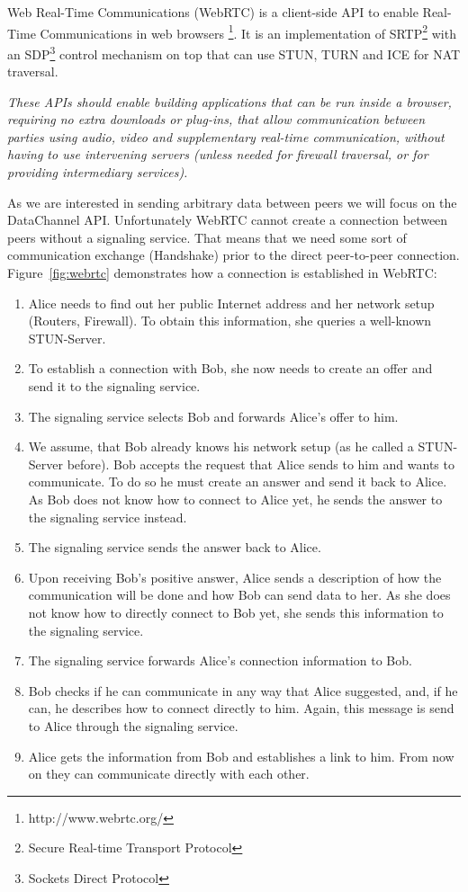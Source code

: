 \documentclass[11pt, english, screen]{report-rd-info}
\begin{document}
Web Real-Time Communications (WebRTC) is a client-side API to enable Real-Time Communications in web browsers \footnote{http://www.webrtc.org/}.
It is an implementation of SRTP\footnote{Secure Real-time Transport Protocol} with an SDP\footnote{Sockets Direct Protocol} control mechanism on top that can use STUN, TURN and ICE for NAT traversal.

\textit{These APIs should enable building applications that can be run inside a browser, requiring no extra downloads or plug-ins, that allow communication between parties using audio, video and supplementary real-time communication, without having to use intervening servers (unless needed for firewall traversal, or for providing intermediary services).}

As we are interested in sending arbitrary data between peers we will focus on the DataChannel API.
Unfortunately WebRTC cannot create a connection between peers without a signaling service. 
That means that we need some sort of communication exchange (Handshake) prior to the direct peer-to-peer connection.
Figure~\ref{fig:webrtc} demonstrates how a connection is established in WebRTC:

\begin{enumerate}
    \item{Alice needs to find out her public Internet address and her network setup (Routers, Firewall).
To obtain this information, she queries a well-known STUN-Server.}
    \item{To establish a connection with Bob, she now needs to create an offer and send it to the signaling service.}
    \item{The signaling service selects Bob and forwards Alice's offer to him.}
    \item{We assume, that Bob already knows his network setup (as he called a STUN-Server before).
Bob accepts the request that Alice sends to him and wants to communicate. To do so he must create an answer and send it back to Alice. As Bob does not know how to connect to Alice yet, he sends the answer to the signaling service instead.}
    \item{The signaling service sends the answer back to Alice.}
    \item{Upon receiving Bob's positive answer, Alice sends a description of how the communication will be done and how Bob can send data to her. As she does not know how to directly connect to Bob yet, she sends this information to the signaling service.}
    \item{The signaling service forwards Alice's connection information to Bob.}
    \item{Bob checks if he can communicate in any way that Alice suggested, and, if he can, he describes how to connect directly to him. Again, this message is send to Alice through the signaling service.}
    \item{Alice gets the information from Bob and establishes a link to him. From now on they can communicate directly with each other. }
\end{enumerate}
\end{document}
